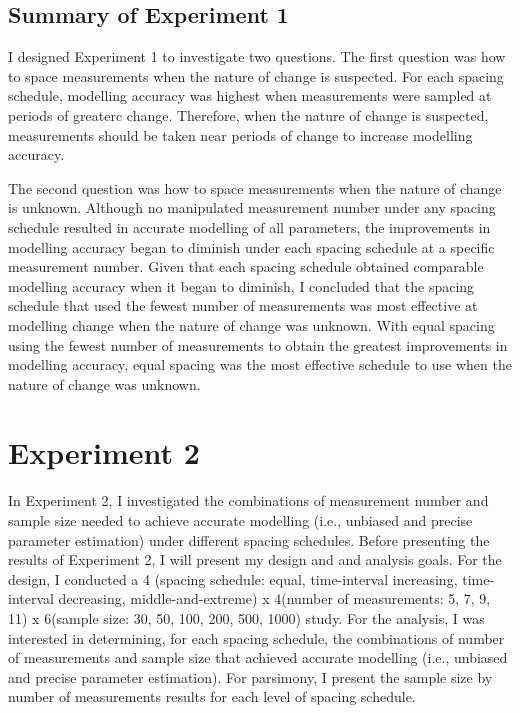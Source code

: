 \documentclass[
12pt, %
twoside,
english]{guelphthesis}
\theoremstyle{definition}
\theoremstyle{definition}
\theoremstyle{definition}
\theoremstyle{definition}
\theoremstyle{remark}
\begin{document}
\hypertarget{summary-of-experiment-1}{%
\section{Summary of Experiment 1}\label{summary-of-experiment-1}}

I designed Experiment 1 to investigate two questions. The first question was how to space measurements when the nature of change is suspected. For each spacing schedule, modelling accuracy was highest when measurements were sampled at periods of greaterc change. Therefore, when the nature of change is suspected, measurements should be taken near periods of change to increase modelling accuracy.

The second question was how to space measurements when the nature of change is unknown. Although no manipulated measurement number under any spacing schedule resulted in accurate modelling of all parameters, the improvements in modelling accuracy began to diminish under each spacing schedule at a specific measurement number. Given that each spacing schedule obtained comparable modelling accuracy when it began to diminish, I concluded that the spacing schedule that used the fewest number of measurements was most effective at modelling change when the nature of change was unknown. With equal spacing using the fewest number of measurements to obtain the greatest improvements in modelling accuracy, equal spacing was the most effective schedule to use when the nature of change was unknown.

\hypertarget{experiment-2}{%
\chapter{Experiment 2}\label{experiment-2}}

In Experiment 2, I investigated the combinations of measurement number and sample size needed to achieve accurate modelling (i.e., unbiased and precise parameter estimation) under different spacing schedules. Before presenting the results of Experiment 2, I will present my design and and analysis goals. For the design, I conducted a 4 (spacing schedule: equal, time-interval increasing, time-interval decreasing, middle-and-extreme) x 4(number of measurements: 5, 7, 9, 11) x 6(sample size: 30, 50, 100, 200, 500, 1000) study. For the analysis, I was interested in determining, for each spacing schedule, the combinations of number of measurements and sample size that achieved accurate modelling (i.e., unbiased and precise parameter estimation). For parsimony, I present the sample size by number of measurements results for each level of spacing schedule.
\end{document}
